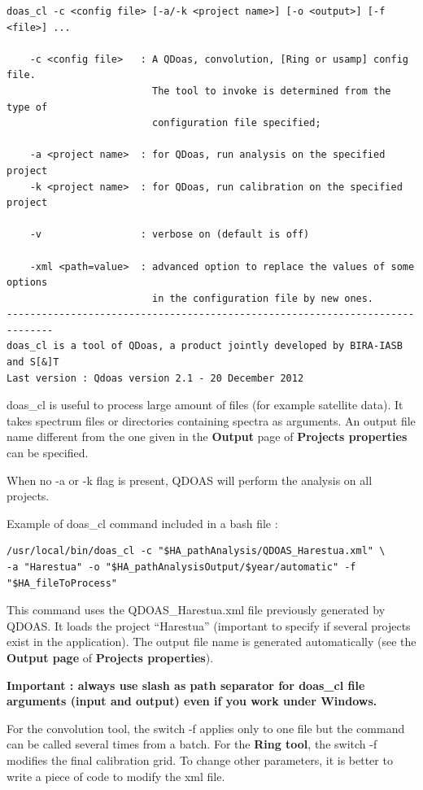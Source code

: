\begin{Verbatim}[fontfamily=courier,fontsize=\relsize{-2}]
doas_cl -c <config file> [-a/-k <project name>] [-o <output>] [-f <file>] ...

    -c <config file>   : A QDoas, convolution, [Ring or usamp] config file.
                         The tool to invoke is determined from the type of
                         configuration file specified;

    -a <project name>  : for QDoas, run analysis on the specified project
    -k <project name>  : for QDoas, run calibration on the specified project

    -v                 : verbose on (default is off)

    -xml <path=value>  : advanced option to replace the values of some options
                         in the configuration file by new ones.
------------------------------------------------------------------------------
doas_cl is a tool of QDoas, a product jointly developed by BIRA-IASB and S[&]T
Last version : Qdoas version 2.1 - 20 December 2012
\end{Verbatim}

doas\_cl is useful to process large amount of files (for example
satellite data).  It takes spectrum files or directories containing
spectra as arguments.  An output file name different from the one
given in the \textbf{Output} page of \textbf{Projects properties} can
be specified.

When no -a or -k flag is present, QDOAS will perform the analysis on
all projects.

Example of doas\_cl command included in a bash file :

\begin{Verbatim}[fontfamily=courier,fontsize=\relsize{-2}]
/usr/local/bin/doas_cl -c "$HA_pathAnalysis/QDOAS_Harestua.xml" \
-a "Harestua" -o "$HA_pathAnalysisOutput/$year/automatic" -f "$HA_fileToProcess"
\end{Verbatim}

This command uses the QDOAS\_Harestua.xml file previously generated by
QDOAS.  It loads the project ``Harestua'' (important to specify if
several projects exist in the application).  The output file name is
generated automatically (see the \textbf{Output page} of
\textbf{Projects properties}).

\textbf{Important : always use slash as path separator for doas\_cl file arguments (input and output) even if you work under Windows.}

For the convolution tool, the switch -f applies only to one file but
the command can be called several times from a batch.  For the
\textbf{Ring tool}, the switch -f modifies the final calibration grid.
To change other parameters, it is better to write a piece of code to
modify the xml file.

